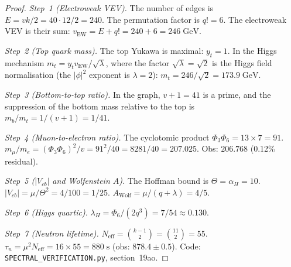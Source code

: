 \documentclass[12pt,a4paper]{article}
\begin{document}
\begin{proof}
\emph{Step~1 (Electroweak VEV).}
The number of edges is $E = vk/2 = 40 \cdot 12/2 = 240$.
The permutation factor is $q! = 6$.
The electroweak VEV is their sum:
$v_{\mathrm{EW}} = E + q! = 240 + 6 = 246\;\text{GeV}$.

\emph{Step~2 (Top quark mass).}
The top Yukawa is maximal: $y_t = 1$.  In the Higgs mechanism
$m_t = y_t v_{\mathrm{EW}}/\sqrt{\lambda}$, where the factor
$\sqrt{\lambda} = \sqrt{2}$ is the Higgs field normalisation
(the $|\phi|^2$ exponent is $\lambda = 2$):
$m_t = 246/\sqrt{2} = 173.9\;\text{GeV}$.

\emph{Step~3 (Bottom-to-top ratio).}
In the graph, $v + 1 = 41$ is a prime, and the suppression of
the bottom mass relative to the top is $m_b/m_t = 1/(v+1) = 1/41$.

\emph{Step~4 (Muon-to-electron ratio).}
The cyclotomic product $\Phi_3 \Phi_6 = 13 \times 7 = 91$.
$m_\mu/m_e = (\Phi_3\Phi_6)^2/v = 91^2/40 = 8281/40 = 207.025$.
Obs: $206.768$ (0.12\% residual).

\emph{Step~5 ($|V_{cb}|$ and Wolfenstein $A$).}
The Hoffman bound is $\Theta = \alpha_H = 10$.
$|V_{cb}| = \mu/\Theta^2 = 4/100 = 1/25$.
$A_{\mathrm{Wolf}} = \mu/(q + \lambda) = 4/5$.

\emph{Step~6 (Higgs quartic).}
$\lambda_H = \Phi_6/(2q^3) = 7/54 \approx 0.130$.

\emph{Step~7 (Neutron lifetime).}
$N_{\mathrm{eff}} = \binom{k-1}{2} = \binom{11}{2} = 55$.
$\tau_n = \mu^2 N_{\mathrm{eff}} = 16 \times 55 = 880\;\text{s}$
(obs: $878.4 \pm 0.5$).
Code: \texttt{SPECTRAL\_VERIFICATION.py}, section~19ao.
\end{proof}
\end{document}
